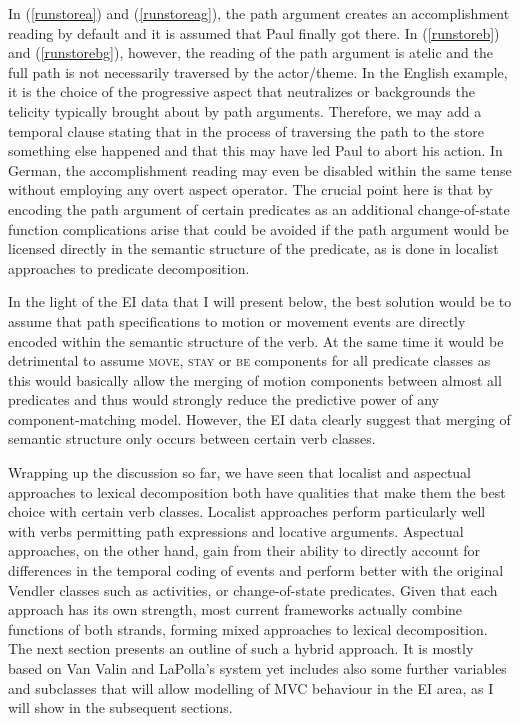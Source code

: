 In (\ref{runstorea}) and (\ref{runstoreag}), the path argument creates an accomplishment reading by default and it is assumed that Paul finally got there. In (\ref{runstoreb}) and (\ref{runstorebg}), however, the reading of the path argument is atelic and the full path is not necessarily traversed by the actor/theme. In the English example, it is the choice of the progressive aspect that neutralizes or backgrounds the telicity typically brought about by path arguments. Therefore, we may add a temporal clause stating that in the process of traversing the path to the store something else happened and that this may have led Paul to abort his action. In German, the accomplishment reading may even be disabled within the same tense without employing any overt aspect operator. The crucial point here is that by encoding the path argument of certain predicates as an additional change-of-state function complications arise that could be avoided if the path argument would be licensed directly in the semantic structure of the predicate, as is done in localist approaches to predicate decomposition.

In the light of the EI data that I will present below, the best solution would be to assume that path specifications to motion or movement events are directly encoded within the semantic structure of the verb. At the same time it would be detrimental to assume \textsc{move}, \textsc{stay} or \textsc{be} components for all predicate classes as this would basically allow the merging of motion components between almost all predicates and thus would strongly reduce the predictive power of any component-matching model. However, the EI data clearly suggest that merging of semantic structure only occurs between certain verb classes.

Wrapping up the discussion so far, we have seen that localist and aspectual approaches to lexical decomposition both have qualities that make them the best choice with certain verb classes. Localist approaches perform particularly well with verbs permitting path expressions and locative arguments. Aspectual approaches, on the other hand, gain from their ability to directly account for differences in the temporal coding of events and perform better with the original Vendler classes such as activities, or change-of-state predicates. Given that each approach has its own strength, most current frameworks actually combine functions of both strands, forming mixed approaches to lexical decomposition. The next section presents an outline of such a hybrid approach. It is mostly based on Van Valin and LaPolla's system yet includes also some further variables and subclasses that will allow modelling of MVC behaviour in the EI area, as I will show in the subsequent sections.


